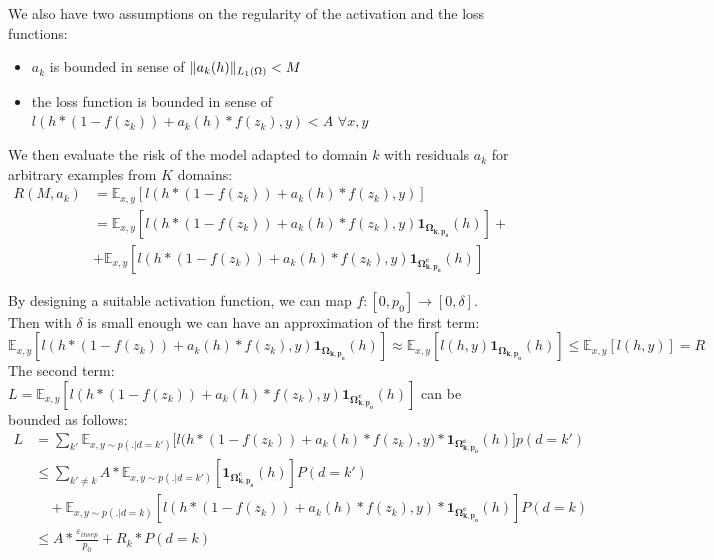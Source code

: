 \documentclass[12pt,a4paper,twoside]{report}
\theoremstyle{definition}
\newcommand{\fyTodo}[1]{\Todo[FY:]{\textcolor{orange}{#1}}}
\begin{document}
We also have two assumptions on the regularity of the activation and the loss functions:
\begin{itemize}
\item $a_k$ is bounded in sense of $\normL{a_k(h)} < M$
\item the loss function is bounded in sense of $l(h * (1-f(z_k)) + a_k(h) * f(z_k), y) < A$ \fyTodo{why not $l(h,y) < A$ ?}
  $\forall x,y$
\end{itemize}
We then evaluate the risk of the model adapted to domain $k$ with residuals $a_k$ for arbitrary examples from $K$ domains:
\begin{equation}
\begin{split}
  R(M,a_k) &= \mathbb{E}_{x,y}[l(h * (1-f(z_k)) + a_k(h) * f(z_k),y)] \\
  &= \mathbb{E}_{x,y}[l(h * (1-f(z_k)) + a_k(h) * f(z_k),y)\mathbf{1}_{\mathbf{\Omega_{k,p_{0}}}}(h)] + \\
  &+ \mathbb{E}_{x,y}[l(h * (1-f(z_k)) + a_k(h) * f(z_k),y) \mathbf{1}_{\mathbf{\Omega_{k,p_{0}}^{c}}}(h)]
\end{split}
\end{equation}

By designing a suitable activation function, we can map $f: [0,p_{0}] \rightarrow [0,\delta]$. Then with $\delta$ is small enough we can have an approximation of the first term:
\begin{equation}
\mathbb{E}_{x,y}[l(h * (1-f(z_k)) + a_k(h) * f(z_k),y)\mathbf{1}_{\mathbf{\Omega_{k,p_{0}}}}(h)] \approx{} \mathbb{E}_{x,y}[l(h,y)\mathbf{1}_\mathbf{\Omega_{k,p_{0}}}(h)] \leq \mathbb{E}_{x,y}[l(h,y)] = R
\label{eq:4}
\end{equation}
The second term: $ L = \mathbb{E}_{x,y}[l(h * (1-f(z_k)) + a_k(h) * f(z_k),y) \mathbf{1}_{\mathbf{\Omega_{k,p_{0}}^{c}}}(h)]$ can be bounded as follows:
\begin{equation*}
\begin{split}
L &= \displaystyle{\mathop{\sum}_{k'}\mathbb{E}_{x,y \sim p(.|d=k')}[l(h * (1-f(z_k))} + a_k(h) * f(z_k),y) * \mathbf{1}_{\mathbf{\Omega_{k,p_{0}}^{c}}}(h)]p(d=k') \\
	& \leq \displaystyle{\mathop{\sum}_{k' \neq k}} A * \mathbb{E}_{x,y \sim p(.|d=k')} [\mathbf{1}_{\mathbf{\Omega_{k,p_{0}}^{c}}}(h)]P(d=k') \\
	& \quad + \mathbb{E}_{x,y \sim p(.|d=k)}[l(h * (1-f(z_k)) + a_k(h) * f(z_k),y) * \mathbf{1}_{\mathbf{\Omega_{k,p_{0}}^{c}}}(h)]P(d=k) \\
	&\leq A * \frac{\mathbb{\varepsilon}_{insep}}{p_{0}} + R_k * P(d=k)
\end{split}
\label{eq:5}
\end{equation*}
\end{document}
